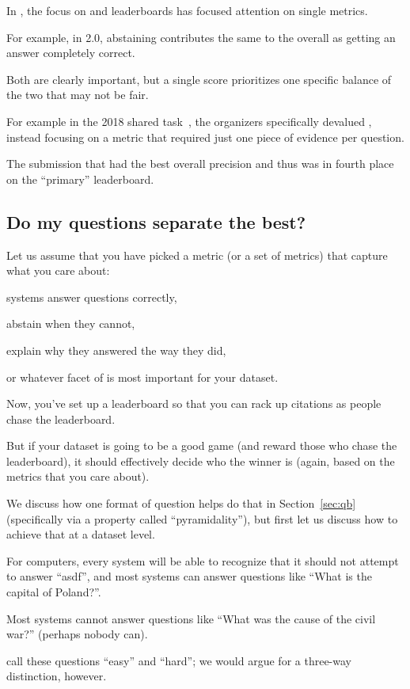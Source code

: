 In \qa{}, the focus on  and leaderboards has focused attention on single metrics.

For example, in \squad{} 2.0, abstaining contributes the same to the overall \fone{} as getting an answer completely correct.

Both are clearly important, but a single score prioritizes one specific balance of the two that may not be fair.

For example in the 2018 \fever{} shared task~\cite{fever-18}, the organizers specifically devalued \fone{}, instead focusing on a metric that required just one piece of evidence per question.

The submission that had the best overall precision and \fone{} thus was in fourth place on the ``primary'' leaderboard.

\subsection{Do my questions separate the best?}
\label{sec:discriminative}

Let us assume that you have picked a metric (or a set of metrics) that capture what you care about:

systems answer questions correctly,

abstain when they cannot,

explain why they answered the way they did,

or whatever facet of  is most important for your dataset.

Now, you've set up a leaderboard so that you can rack up citations as people chase the leaderboard.

But if your dataset is going to be a good game (and reward those who chase the leaderboard), it should effectively decide who the winner is (again, based on the metrics that you care about).

We discuss how one format of question helps do that in Section~\ref{sec:qb} (specifically via a property called ``pyramidality''), but first let us discuss how to achieve that at a dataset level.

For computers, every system will be able to recognize that it should not attempt to answer ``asdf'', and most systems can answer questions like ``What is the capital of Poland?''.

Most systems cannot answer questions like ``What was the cause of the  civil war?'' (perhaps nobody can).

 call these questions ``easy'' and ``hard''; we would argue for a three-way distinction, however.

